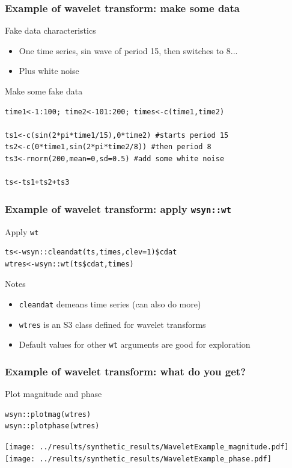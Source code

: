 \documentclass{beamer}
\begin{document}
\begin{frame}[fragile]
\frametitle{Example of wavelet transform: make some data}
\begin{block}{Fake data characteristics}
\begin{itemize}
\item One time series, sin wave of period 15, then switches to 8...
\item Plus white noise
\end{itemize}
\end{block}
\begin{exampleblock}{Make some fake data}
\begin{verbatim}
time1<-1:100; time2<-101:200; times<-c(time1,time2)

ts1<-c(sin(2*pi*time1/15),0*time2) #starts period 15
ts2<-c(0*time1,sin(2*pi*time2/8)) #then period 8
ts3<-rnorm(200,mean=0,sd=0.5) #add some white noise

ts<-ts1+ts2+ts3 
\end{verbatim}
\end{exampleblock}
\end{frame}

\begin{frame}[fragile]
\frametitle{Example of wavelet transform: apply \texttt{wsyn::wt}}
\begin{exampleblock}{Apply \texttt{wt}}
\begin{verbatim}
ts<-wsyn::cleandat(ts,times,clev=1)$cdat
wtres<-wsyn::wt(ts$cdat,times)
\end{verbatim}
\end{exampleblock}
\begin{block}{Notes}
\begin{itemize}
\item \texttt{cleandat} demeans time series (can also do more)
\item \texttt{wtres} is an S3 class defined for wavelet transforms
\item Default values for other \texttt{wt} arguments are good for exploration
\end{itemize}
\end{block}
\end{frame}

\begin{frame}[fragile]
\frametitle{Example of wavelet transform: what do you get?}
\begin{exampleblock}{Plot magnitude and phase}
\begin{verbatim}
wsyn::plotmag(wtres)
wsyn::plotphase(wtres)
\end{verbatim}
\end{exampleblock}
\texttt{[image: ../results/synthetic\_results/WaveletExample\_magnitude.pdf]}
\texttt{[image: ../results/synthetic\_results/WaveletExample\_phase.pdf]}
\end{frame}
\end{document}
